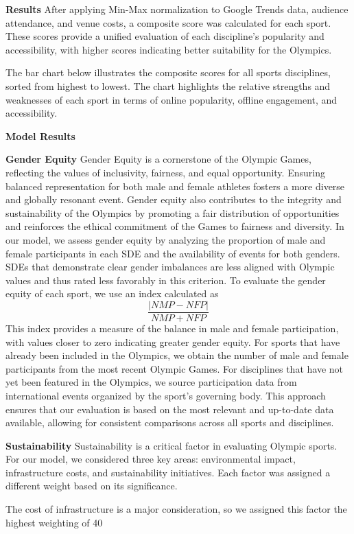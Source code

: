 \documentclass[12pt]{article}
\begin{document}
\textbf{Results}
After applying Min-Max normalization to Google Trends data, audience attendance, and venue costs, a composite score was calculated for each sport. These scores provide a unified evaluation of each discipline's popularity and accessibility, with higher scores indicating better suitability for the Olympics.

The bar chart below illustrates the composite scores for all sports disciplines, sorted from highest to lowest. The chart highlights the relative strengths and weaknesses of each sport in terms of online popularity, offline engagement, and accessibility.

\textbf{Model Results}

\textbf{Gender Equity}
Gender Equity is a cornerstone of the Olympic Games, reflecting the values of inclusivity, fairness, and equal opportunity. Ensuring balanced representation for both male and female athletes fosters a more diverse and globally resonant event. Gender equity also contributes to the integrity and sustainability of the Olympics by promoting a fair distribution of opportunities and reinforces the ethical commitment of the Games to fairness and diversity. In our model, we assess gender equity by analyzing the proportion of male and female participants in each SDE and the availability of events for both genders. SDEs that demonstrate clear gender imbalances are less aligned with Olympic values and thus rated less favorably in this criterion.
To evaluate the gender equity of each sport, we use an index calculated as
\[\frac{|NMP-NFP|}{NMP+NFP}\]
This index provides a measure of the balance in male and female participation, with values closer to zero indicating greater gender equity. For sports that have already been included in the Olympics, we obtain the number of male and female participants from the most recent Olympic Games. For disciplines that have not yet been featured in the Olympics, we source participation data from international events organized by the sport’s governing body. This approach ensures that our evaluation is based on the most relevant and up-to-date data available, allowing for consistent comparisons across all sports and disciplines.

\textbf{Sustainability}
Sustainability is a critical factor in evaluating Olympic sports. For our model, we considered three key areas: environmental impact, infrastructure costs, and sustainability initiatives. Each factor was assigned a different weight based on its significance.

The cost of infrastructure is a major consideration, so we assigned this factor the highest weighting of 40%
\end{document}
